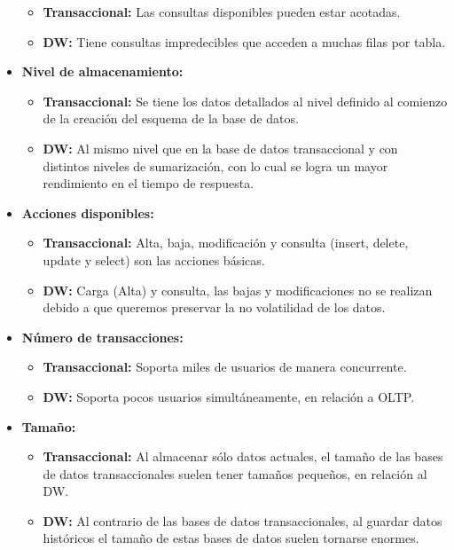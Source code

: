 \documentclass[a4paper,11pt]{article}
\begin{document}
\begin{itemize}
\begin{itemize}
          \item \textbf{Transaccional:} Las consultas disponibles pueden estar acotadas.
          \item \textbf{DW:} Tiene consultas impredecibles que acceden a muchas filas por tabla.
        \end{itemize}
      \item \textbf{Nivel de almacenamiento:}
        \begin{itemize}
          \item \textbf{Transaccional:} Se tiene los datos detallados al nivel definido al comienzo de la creación del esquema de la base de datos.
          \item \textbf{DW:} Al mismo nivel que en la base de datos transaccional y con distintos niveles de sumarización, con lo cual se logra un mayor
          rendimiento en el tiempo de respuesta.
        \end{itemize}
      \item \textbf{Acciones disponibles:}
        \begin{itemize}
          \item \textbf{Transaccional:} Alta, baja, modificación y consulta (insert, delete, update y select) son las acciones básicas.
          \item \textbf{DW:} Carga (Alta) y consulta, las bajas y modificaciones no se realizan debido a que queremos preservar la no volatilidad de los
          datos.
        \end{itemize}
      \item \textbf{Número de transacciones:}
        \begin{itemize}
          \item \textbf{Transaccional:} Soporta miles de usuarios de manera concurrente.
          \item \textbf{DW:} Soporta pocos usuarios simultáneamente, en relación a  OLTP.
        \end{itemize}
      \item \textbf{Tamaño:}
        \begin{itemize}
          \item \textbf{Transaccional:} Al almacenar sólo datos actuales, el tamaño de las bases de datos transaccionales suelen tener tamaños pequeños,
          en relación al DW.
          \item \textbf{DW:} Al contrario de las bases de datos transaccionales, al guardar datos históricos el tamaño de estas bases de datos suelen
          tornarse enormes.

\end{itemize}
\end{itemize}
\end{document}
